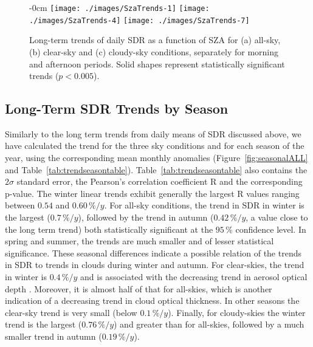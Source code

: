\documentclass[applsci,article,submit,moreauthors,pdftex]{Definitions/mdpi}
\begin{document}
\begin{figure}[h!]
    \begin{adjustwidth}{-\extralength}{0cm}
        {\centering 
                {\texttt{[image: ./images/SzaTrends-1]}}\hfill
                {\texttt{[image: ./images/SzaTrends-4]}}\hfill
                {\texttt{[image: ./images/SzaTrends-7]}}
        }
    \end{adjustwidth}
    \caption{Long-term trends of daily SDR as a function of SZA for (a) all-sky, (b) clear-sky and (c) cloudy-sky conditions, separately for morning and afternoon periods. Solid shapes represent statistically significant trends ($p < 0.005$).}\label{fig:szatrends}
\end{figure}

\hypertarget{long-term-sdr-trends-by-season}{%
\subsection{Long-Term SDR Trends by
Season}\label{long-term-sdr-trends-by-season}}

Similarly to the long term trends from daily means of SDR discussed
above, we have calculated the trend for the three sky conditions and for
each season of the year, using the corresponding mean monthly anomalies
(Figure~\ref{fig:seasonalALL} and Table~\ref{tab:trendseasontable}).
Table~\ref{tab:trendseasontable} also contains the \(2\sigma\) standard
error, the Pearson's correlation coefficient R and the corresponding
p-value. The winter linear trends exhibit generally the largest R values
ranging between \(0.54\) and \(0.60\,\%/y\). For all-sky conditions, the
trend in SDR in winter is the largest (\(0.7\,\%/y\)), followed by the
trend in autumn (\(0.42\,\%/y\), a value close to the long term trend)
both statistically significant at the \(95\,\%\) confidence level. In
spring and summer, the trends are much smaller and of lesser statistical
significance. These seasonal differences indicate a possible relation of
the trends in SDR to trends in clouds during winter and autumn. For
clear-skies, the trend in winter is \(0.4\,\%/y\) and is associated with
the decreasing trend in aerosol optical depth \citep{Siomos2020}.
Moreover, it is almost half of that for all-skies, which is another
indication of a decreasing trend in cloud optical thickness. In other
seasons the clear-sky trend is very small (below \(0.1\,\%/y\)).
Finally, for cloudy-skies the winter trend is the largest
(\(0.76\,\%/y\)) and greater than for all-skies, followed by a much
smaller trend in autumn (\(0.19\,\%/y\)).
\end{document}
